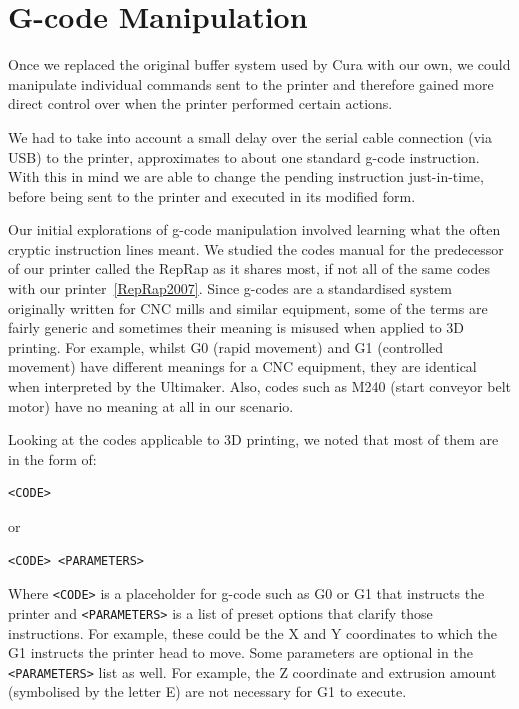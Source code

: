 \documentclass[11pt]{report} %
\begin{document}
\section{G-code Manipulation}
\label{section:GCodeManipulation}
Once we replaced the original buffer system used by Cura with our own, we could manipulate individual commands sent to the printer and therefore gained more direct control over when the printer performed certain actions.

We had to take into account a small delay over the serial cable connection (via USB) to the printer, approximates to about one standard g-code instruction. With this in mind we are able to change the pending instruction just-in-time, before being sent to the printer and executed in its modified form.

Our initial explorations of g-code manipulation involved learning what the often cryptic instruction lines meant. We studied the codes manual for the predecessor of our printer called the RepRap as it shares most, if not all of the same codes with our printer~\ref{RepRap2007}. Since g-codes are a standardised system originally written for CNC mills and similar equipment, some of the terms are fairly generic and sometimes their meaning is misused when applied to 3D printing. For example, whilst G0 (rapid movement) and G1 (controlled movement) have different meanings for a CNC equipment, they are identical when interpreted by the Ultimaker. Also, codes such as M240 (start conveyor belt motor) have no meaning at all in our scenario.

Looking at the codes applicable to 3D printing, we noted that most of them are in the form of:
\begin{verbatim}
<CODE>
\end{verbatim}
or
\begin{verbatim}
<CODE> <PARAMETERS>
\end{verbatim}

Where \verb|<CODE>| is a placeholder for g-code such as G0 or G1 that instructs the printer and \verb|<PARAMETERS>| is a list of preset options that clarify those instructions. For example, these could be the X and Y coordinates to which the G1 instructs the printer head to move. Some parameters are optional in the \verb|<PARAMETERS>| list as well. For example, the Z coordinate and extrusion amount (symbolised by the letter E) are not necessary for G1 to execute.
\end{document}
